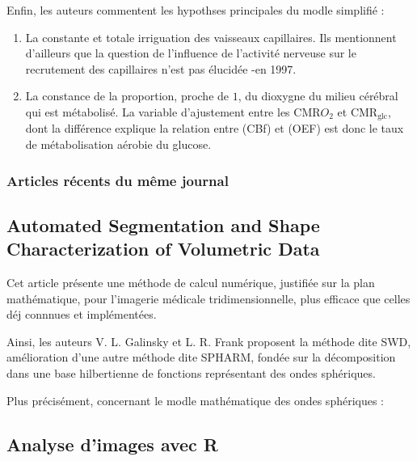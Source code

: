 \par
Enfin, les auteurs commentent les hypothses principales du modle simplifi\'e :
\begin{enumerate}
\item La constante et totale irriguation des vaisseaux capillaires. %
Ils mentionnent d'ailleurs que la question de l'influence de l'activit\'e nerveuse sur le recrutement des capillaires n'est pas \'elucid\'ee -en 1997.
\item La constance de la proportion, proche de $1$, du dioxygne du milieu c\'er\'ebral qui est m\'etabolis\'e. %
La variable d'ajustement entre les CMR$O_2$ et CMR${}_{\text{glc}}$, dont la diff\'erence explique la relation entre (CBf) et (OEF) est donc le taux de m\'etabolisation a\'erobie du glucose.
\end{enumerate}

\subsubsection{Articles r\'ecents du m\^eme journal}



\subsection{Automated Segmentation and Shape Characterization of Volumetric Data \cite{frsph}}

Cet article pr\'esente une m\'ethode de calcul num\'erique, justifi\'ee sur la plan math\'ematique, %
pour l'imagerie m\'edicale tridimensionnelle, plus efficace que celles d\'ej connnues et impl\'ement\'ees.

\par
Ainsi, les auteurs V. L. Galinsky et L. R. Frank proposent la m\'ethode dite SWD, am\'elioration d'une autre m\'ethode dite \og{} SPHARM\fg{}, %
fond\'ee sur la d\'ecomposition dans une base hilbertienne de fonctions  repr\'esentant des ondes sph\'eriques.

\ligneinter
Plus pr\'ecis\'ement, concernant le modle math\'ematique des ondes sph\'eriques :


\subsection{Analyse d'images avec R}

%